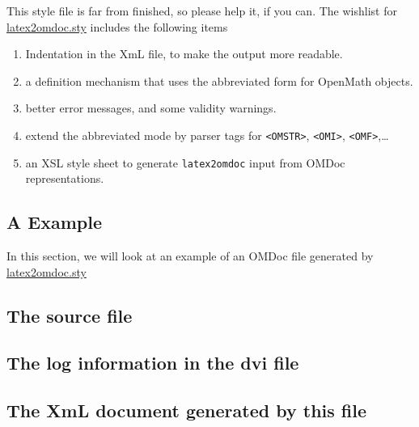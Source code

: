 \documentclass{article}
\def\xml{{\sc XmL}}
\def\xsl{{\sc XSL}}
\def\openmath{{\sc OpenMath}}
\def\omdocname{{\sc OMDoc}}
\begin{document}
This style file is far from finished, so please help it, if you can. The wishlist
for {\url{latex2omdoc.sty}} includes the following items
\begin{enumerate}
\item Indentation in the {\xml} file, to make the output more readable. 
\item a definition mechanism that uses the abbreviated form for {\openmath}
  objects.
\item better error messages, and some validity warnings. 
\item extend the abbreviated mode by parser tags for {\tt <OMSTR>}, {\tt <OMI>},
  {\tt <OMF>},\ldots
\item an {\xsl} style sheet to generate {\tt latex2omdoc} input from {\omdocname}
  representations.
\end{enumerate}




\newpage
\begin{appendix}
\section{A {} Example}\label{sec:omdocex}
In this section, we will look at an example of an {\omdocname} file generated by
{\url{latex2omdoc.sty}} 
\subsection{The \protect{\LaTeX} source file}
{\scriptsize}\newpage
\subsection{The log information in the {\sc dvi} file}
\newpage
\subsection{The {\xml} document generated by this file}
{\scriptsize}
\end{appendix}
\end{document}
